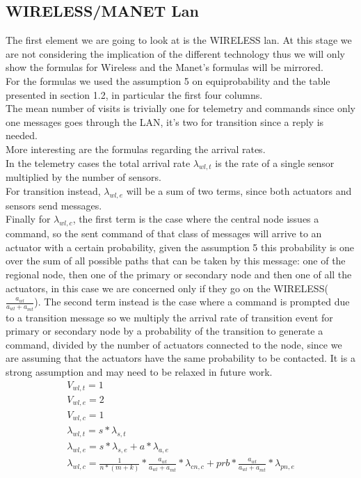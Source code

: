 \documentclass[11pt]{article}
\begin{document}
\subsection{WIRELESS/MANET Lan}
The first element we are going to look at is the WIRELESS lan. At this stage we are not considering the implication of the different technology thus we will only show the formulas for Wireless and the Manet's formulas will be mirrored.\\
For the formulas we used the assumption 5 on equiprobability and the table presented in section 1.2, in particular the first four columns.\\
The mean number of visits is trivially one for telemetry and commands since only one messages goes through the LAN, it's two for transition since a reply is needed.\\
More interesting are the formulas regarding the arrival rates.\\
In the telemetry cases the total arrival rate $\lambda_{wl, t}$ is the rate of a single sensor multiplied by the number of sensors.\\
For transition instead, $\lambda_{wl, e}$ will be a sum of two terms, since both actuators and sensors send messages.\\
Finally for $\lambda_{wl, c}$, the first term is the case where the central node issues a command, so the sent command of that class of messages will arrive to an actuator with a certain probability, given the assumption 5 this probability is one over the sum of all possible paths that can be taken by this message: one of the regional node, then one of the primary or secondary node and then one of all the actuators, in this case we are concerned only if they go on the WIRELESS($\frac{a_{wl}}{a_{wl}+a_{mt}}$). The second term instead is the case where a command is prompted due to a transition message so we multiply the arrival rate of transition event for primary or secondary node by a probability of the transition to generate a command, divided by the number of actuators connected to the node, since we are assuming that the actuators have the same probability to be contacted. It is a strong assumption and may need to be relaxed in future work.\\
\begin{equation}
    \begin{array}{l}
        V_{wl, t} = 1 \\
        V_{wl, e} = 2 \\ %
        V_{wl,c} = 1 \\
        \lambda_{wl, t} = s*\lambda_{s, t} \\
        \lambda_{wl, e} = s*\lambda_{s, e} + a*\lambda_{a, e} \\
				\lambda_{wl, c} = \frac{1}{n*(m+k)} * \frac{a_{wl}}{a_{wl}+a_{mt}} * \lambda_{cn, c} + prb * \frac{a_{wl}}{a_{wl}+a_{mt}} * \lambda_{pn,e}   \\\
    \end{array}
\end{equation}
\end{document}
